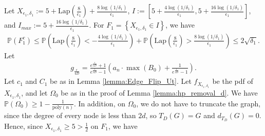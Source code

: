 \documentclass{article}
\begin{document}
Let $X_{\epsilon_1, \delta_1} := 5 + \mathrm{Lap}\left(\frac{8}{\epsilon_1}\right) + \frac{8\log(1/\delta_1)}{\epsilon_1}$, $I := \left[5 + \frac{4\log(1/\delta_1)}{\epsilon_1}, 5 + \frac{16\log(1/\delta_1)}{\epsilon_1}\right]$, and $I_{max} := 5 + \frac{16\log(1/\delta_1)}{\epsilon_1}$. For $F_1 = \left\{X_{\epsilon_1, \delta_1} \in I\right\}$, we have
\begin{align*}
 \mathbb{P}\left(F_1^c\right) \leq \mathbb{P}\left(\mathrm{Lap}\left(\frac{8}{\epsilon_1}\right) < -\frac{4\log(1/\delta_1)}{\epsilon_1}\right) + \mathbb{P}\left(\mathrm{Lap}\left(\frac{8}{\epsilon_1}\right) > \frac{8\log(1/\delta_1)}{\epsilon_1}\right) \leq 2\sqrt{\delta_1}.
\end{align*}
Let
\begin{align*}
g_{\frac{\epsilon}{4D}} = \frac{e^{\frac{\epsilon}{4D}} + 1}{e^{\frac{\epsilon}{4D}} - 1}\left(a_n \cdot\max(B_0) + \frac{1}{e^{\frac{\epsilon}{4D}} - 1}\right).
\end{align*}
Let $c_1$ and $C_1$ be as in Lemma \ref{lemma:Edge_Flip_Ut}. Let $f_{X_{\epsilon_1, \delta_1}}$ be the pdf of $X_{\epsilon_1, \delta_1}$, and let $\Omega_0$ be as in the proof of Lemma \ref{lemma:hp_removal_d}. We have $\mathbb{P}(\Omega_0) \geq 1 - \frac{1}{\mathrm{poly}(n)}$. In addition, on $\Omega_0$, we do not have to truncate the graph, since the degree of every node is less than $2d$, so $T_{D}(G) = G$ and $d_{T_{D}}(G) = 0$. Hence, since $X_{\epsilon_1, \delta_1} \geq 5 > \frac{1}{2}$ on $F_1$, we have
\end{document}
